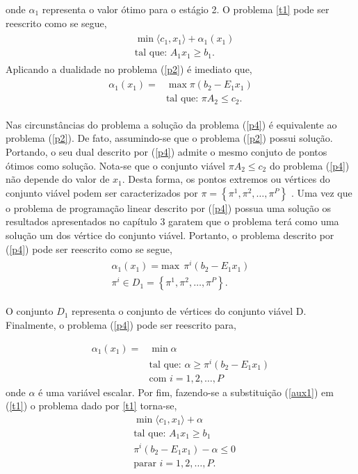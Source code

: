 onde ${\alpha}_{1}$ representa o valor \'otimo para o est\'agio 2. O problema \ref{t1} pode ser reescrito como se segue,
\begin{align}
  \begin{split}	
  &\min \langle c_1,x_1\rangle + {\alpha}_{1}(x_1) \\
&\mbox{tal que: }	A_1x_1 \geq b_1.
\end{split}
  \end{align}
Aplicando a dualidade no problema (\ref{p2}) \'e imediato que,
\begin{align}
  \begin{split}	
 \alpha_{1}(x_1) = &\max \pi (b_2 - E_1x_1 ) \\
	&\mbox{tal que: }\pi A_2  \leq c_2.
  \end{split}
 	\label{p4}
\end{align}

Nas circunst\^ancias do problema a solu\c c\~ao da problema (\ref{p4}) \'e equivalente ao problema (\ref{p2}). De fato, 
assumindo-se que o problema (\ref{p2}) possui solu\c c\~ao. Portando, o seu dual descrito por (\ref{p4}) admite o mesmo
conjuto de pontos \'otimos como solu\c c\~ao.
Nota-se que o conjunto vi\'avel $\pi A_2 \leq c_2$ do problema (\ref{p4}) n\~ao depende do valor de $x_1$. Desta forma, os
pontos extremos ou v\'ertices do conjunto vi\'avel podem ser caracterizados por $\pi = \left\{ \pi^1, \pi^2, \dots,
\pi^P \right\}$ \cite{cp}. Uma vez
que o problema de programa\c c\~ao linear descrito por (\ref{p4}) possua uma solu\c c\~ao os resultados apresentados no cap\'itulo 3
garatem que o problema ter\'a como uma solu\c c\~ao um dos v\'ertice do conjunto vi\'avel.
Portanto, o problema descrito por (\ref{p4}) pode ser reescrito como se segue,
\begin{align*}
  \begin{aligned}
	{\alpha}_{1}(x_1) = \text {max} \ \ {\pi}^{i} (b_2 - E_1x_1) \\
	{\pi}^{i} \in  D_1 = \left\{ {\pi}^{1}, {\pi}^{2},\dots, {\pi}^{P} \right\}.
  \end{aligned}
\end{align*}

O conjunto $D_1$ representa o conjunto de v\'ertices do conjunto vi\'avel D.
Finalmente, o problema (\ref{p4}) pode ser reescrito para, 

\begin{align}
	\label{aux1}
  	\alpha_{1}(x_1) =& \min\alpha \nonumber \\ 
	&\mbox{tal que: }\alpha \geq \pi^{i}(b_2 - E_1 x_1) \\
	&\mbox{com } i = 1,2, \dots , P \nonumber
\end{align}
onde $\alpha$ \'e uma vari\'avel escalar. Por fim, fazendo-se a substitui\c c\~ao (\ref{aux1}) em (\ref{t1}) o problema
dado por \ref{t1} torna-se,
\begin{align}
	\label{fin1}
&\min \langle c_1,x_1\rangle + \alpha \nonumber\\
&\mbox{tal que: }	A_1 x_1 \geq b_1 \\
&	\pi^{i}(b_2 - E_1x_1) - \alpha \leq 0\nonumber \\ 
&\mbox{parar }	i = 1, 2, \dots , P.\nonumber
\end{align}

